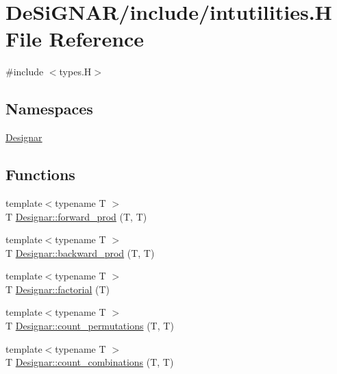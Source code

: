 \hypertarget{intutilities_8_h}{}\section{De\+Si\+G\+N\+A\+R/include/intutilities.H File Reference}
\label{intutilities_8_h}
{\ttfamily \#include $<$types.\+H$>$}\newline
\subsection*{Namespaces}
\begin{DoxyCompactItemize}
\item 
 \hyperlink{namespace_designar}{Designar}
\end{DoxyCompactItemize}
\subsection*{Functions}
\begin{DoxyCompactItemize}
\item 
{\footnotesize template$<$typename T $>$ }\\T \hyperlink{namespace_designar_a38bdfe24d16d5f665e10d75834cded69}{Designar\+::forward\+\_\+prod} (T, T)
\item 
{\footnotesize template$<$typename T $>$ }\\T \hyperlink{namespace_designar_aed558aafc7789fb59b2381d0894b51cb}{Designar\+::backward\+\_\+prod} (T, T)
\item 
{\footnotesize template$<$typename T $>$ }\\T \hyperlink{namespace_designar_a7760d03bc384dbf96c672da4848b4910}{Designar\+::factorial} (T)
\item 
{\footnotesize template$<$typename T $>$ }\\T \hyperlink{namespace_designar_a9de2f2da31210c49529db21c84162576}{Designar\+::count\+\_\+permutations} (T, T)
\item 
{\footnotesize template$<$typename T $>$ }\\T \hyperlink{namespace_designar_ad5ab5ff3ec3c98286d6a9ff3a06b8d19}{Designar\+::count\+\_\+combinations} (T, T)
\end{DoxyCompactItemize}
